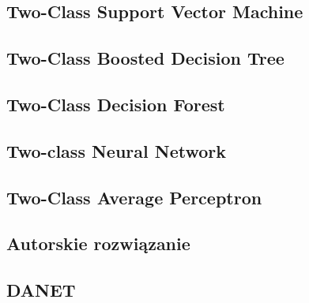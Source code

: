 \subsection{Two-Class Support Vector Machine}
\subsection{Two-Class Boosted Decision Tree}
\subsection{Two-Class Decision Forest}
\subsection{Two-class Neural Network}
\subsection{Two-Class Average Perceptron}
\subsection{Autorskie rozwiązanie}
\subsection{DANET}




